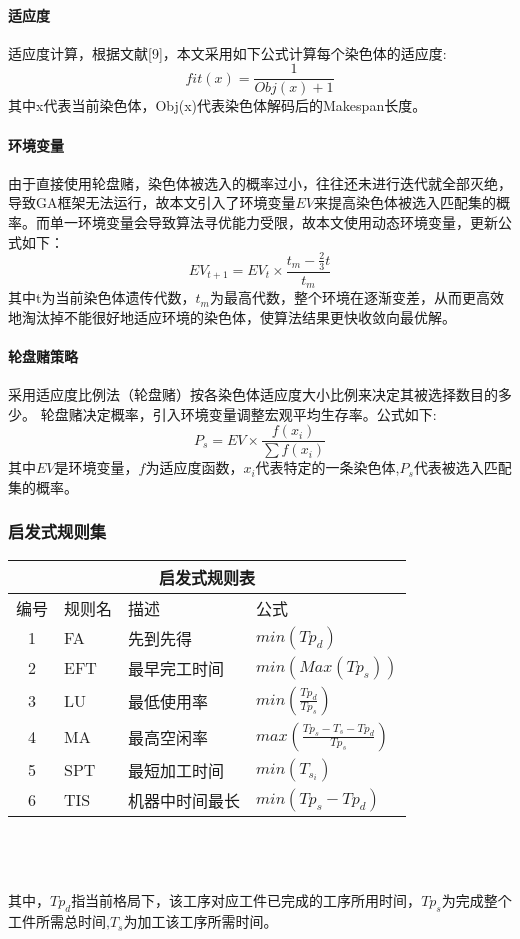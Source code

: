 \documentclass[UTF8]{ctexart}
\begin{document}
\begin{multicols}{2}
\paragraph{适应度}
适应度计算，根据文献[9]，本文采用如下公式计算每个染色体的适应度:
\[fit(x) = \frac{1}{Obj(x)+1} \]
其中x代表当前染色体，Obj(x)代表染色体解码后的Makespan长度。
\paragraph{环境变量}由于直接使用轮盘赌，染色体被选入的概率过小，往往还未进行迭代就全部灭绝，导致GA框架无法运行，故本文引入了环境变量$EV$来提高染色体被选入匹配集的概率。而单一环境变量会导致算法寻优能力受限，故本文使用动态环境变量，更新公式如下：
\[EV_{t+1} = EV_t\times \frac{t_m - \frac{2}{3}t}{t_m} \]
其中t为当前染色体遗传代数，$t_m$为最高代数，整个环境在逐渐变差，从而更高效地淘汰掉不能很好地适应环境的染色体，使算法结果更快收敛向最优解。
\paragraph{轮盘赌策略}
采用适应度比例法（轮盘赌）按各染色体适应度大小比例来决定其被选择数目的多少。
轮盘赌决定概率，引入环境变量调整宏观平均生存率。公式如下:
\[P_s = EV\times \frac{f(x_i)}{\sum f(x_i)} \]
其中$EV$是环境变量，$f$为适应度函数，$x_i$代表特定的一条染色体,$P_s$代表被选入匹配集的概率。
\subsubsection{启发式规则集}
\begin{tabular}{clll}  
\hline
\multicolumn{4}{c}{启发式规则表} \\
\hline
编号	&	规则名&		描述						
&	公式 \\
\hline
1	&	FA	&先到先得			
& $min(Tp_{d})$\\
2	&	EFT	&最早完工时间
& $min(Max(Tp_{s}))$\\
3	&	LU	&最低使用率
& $min(\frac{Tp_{d}}{Tp_{s}} )$\\
4	&	MA	&最高空闲率
& $max(\frac{Tp_{s}-T_s-Tp_{d}}{Tp_{s}} )$ \\
5	&	SPT	&最短加工时间
& $min(T_{s_i})$  \\
6	&	TIS	&机器中时间最长
& $min(Tp_{s}-Tp_{d})$ \\
\hline
\end{tabular}
\\\\\\
\indent 其中，$Tp_{d}$指当前格局下，该工序对应工件已完成的工序所用时间，$Tp_{s}$为完成整个工件所需总时间,$T_s$为加工该工序所需时间。


\end{multicols}
\end{document}
